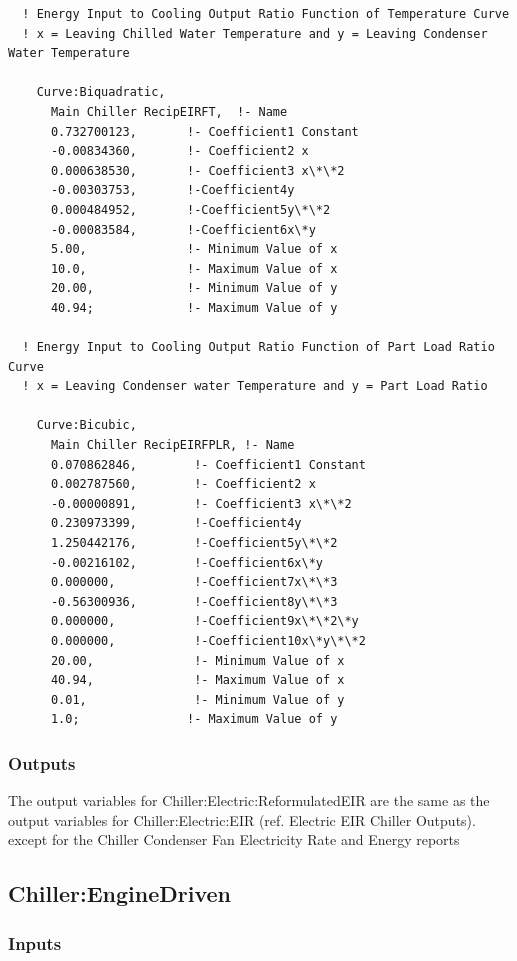 \begin{lstlisting}
  ! Energy Input to Cooling Output Ratio Function of Temperature Curve
  ! x = Leaving Chilled Water Temperature and y = Leaving Condenser Water Temperature

    Curve:Biquadratic,
      Main Chiller RecipEIRFT,  !- Name
      0.732700123,       !- Coefficient1 Constant
      -0.00834360,       !- Coefficient2 x
      0.000638530,       !- Coefficient3 x\*\*2
      -0.00303753,       !-Coefficient4y
      0.000484952,       !-Coefficient5y\*\*2
      -0.00083584,       !-Coefficient6x\*y
      5.00,              !- Minimum Value of x
      10.0,              !- Maximum Value of x
      20.00,             !- Minimum Value of y
      40.94;             !- Maximum Value of y

  ! Energy Input to Cooling Output Ratio Function of Part Load Ratio Curve
  ! x = Leaving Condenser water Temperature and y = Part Load Ratio

    Curve:Bicubic,
      Main Chiller RecipEIRFPLR, !- Name
      0.070862846,        !- Coefficient1 Constant
      0.002787560,        !- Coefficient2 x
      -0.00000891,        !- Coefficient3 x\*\*2
      0.230973399,        !-Coefficient4y
      1.250442176,        !-Coefficient5y\*\*2
      -0.00216102,        !-Coefficient6x\*y
      0.000000,           !-Coefficient7x\*\*3
      -0.56300936,        !-Coefficient8y\*\*3
      0.000000,           !-Coefficient9x\*\*2\*y
      0.000000,           !-Coefficient10x\*y\*\*2
      20.00,              !- Minimum Value of x
      40.94,              !- Maximum Value of x
      0.01,               !- Minimum Value of y
      1.0;               !- Maximum Value of y
\end{lstlisting}

\subsubsection{Outputs}\label{outputs-5-006}

The output variables for Chiller:Electric:ReformulatedEIR are the same as the output variables for Chiller:Electric:EIR (ref. Electric EIR Chiller Outputs). except for the Chiller Condenser Fan Electricity Rate and Energy reports

\subsection{Chiller:EngineDriven}\label{chillerenginedriven}

\subsubsection{Inputs}\label{inputs-6-018}

